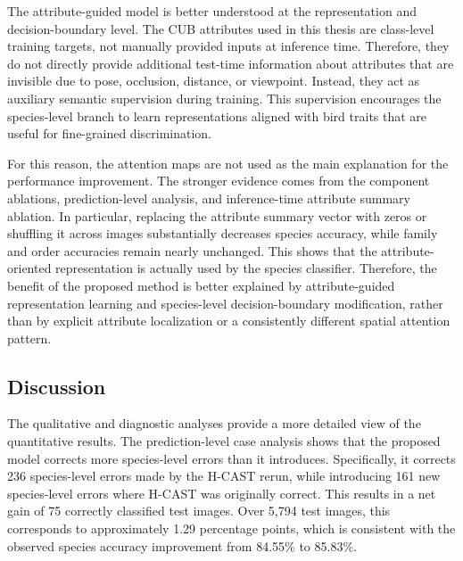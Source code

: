 The attribute-guided model is better understood at the representation and decision-boundary level. The CUB attributes used in this thesis are class-level training targets, not manually provided inputs at inference time. Therefore, they do not directly provide additional test-time information about attributes that are invisible due to pose, occlusion, distance, or viewpoint. Instead, they act as auxiliary semantic supervision during training. This supervision encourages the species-level branch to learn representations aligned with bird traits that are useful for fine-grained discrimination.

For this reason, the attention maps are not used as the main explanation for the performance improvement. The stronger evidence comes from the component ablations, prediction-level analysis, and inference-time attribute summary ablation. In particular, replacing the attribute summary vector with zeros or shuffling it across images substantially decreases species accuracy, while family and order accuracies remain nearly unchanged. This shows that the attribute-oriented representation is actually used by the species classifier. Therefore, the benefit of the proposed method is better explained by attribute-guided representation learning and species-level decision-boundary modification, rather than by explicit attribute localization or a consistently different spatial attention pattern.














\subsection{Discussion}

The qualitative and diagnostic analyses provide a more detailed view of the quantitative results. The prediction-level case analysis shows that the proposed model corrects more species-level errors than it introduces. Specifically, it corrects 236 species-level errors made by the H-CAST rerun, while introducing 161 new species-level errors where H-CAST was originally correct. This results in a net gain of 75 correctly classified test images. Over 5,794 test images, this corresponds to approximately 1.29 percentage points, which is consistent with the observed species accuracy improvement from 84.55\% to 85.83\%.

